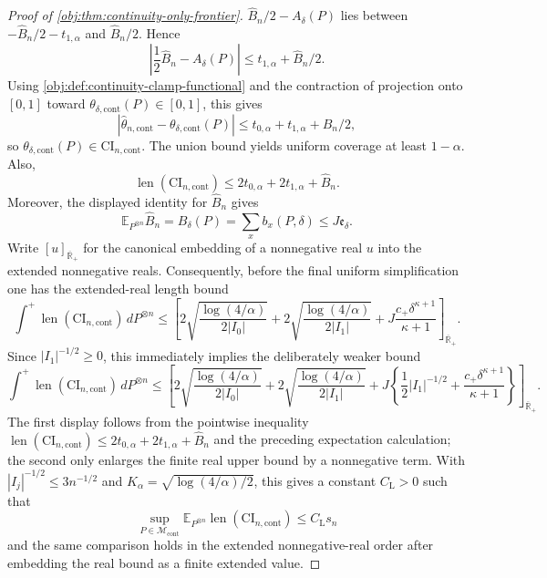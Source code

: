 \begin{proof}[Proof of \cref{obj:thm:continuity-only-frontier}]
\(\widehat B_n/2-A_\delta(P)\) lies between
\(-\widehat B_n/2-t_{1,\alpha}\) and \(\widehat B_n/2\).  Hence
\[
\left|\frac12\widehat B_n-A_\delta(P)\right|
\leq t_{1,\alpha}+\widehat B_n/2.
\]
Using \cref{obj:def:continuity-clamp-functional} and the contraction of projection onto \([0,1]\)
toward \(\theta_{\delta,\mathrm{cont}}(P)\in[0,1]\), this gives
\[
\left|\widehat\theta_{n,\mathrm{cont}}-\theta_{\delta,\mathrm{cont}}(P)\right|
\leq t_{0,\alpha}+t_{1,\alpha}+\widehat B_n/2,
\]
so \(\theta_{\delta,\mathrm{cont}}(P)\in\mathrm{CI}_{n,\mathrm{cont}}\).  The union bound yields uniform coverage at least \(1-\alpha\).  Also,
\[
\operatorname{len}(\mathrm{CI}_{n,\mathrm{cont}})
\leq
2t_{0,\alpha}+2t_{1,\alpha}+\widehat B_n .
\]
Moreover, the displayed identity for \(\widehat B_n\) gives
\[
\mathbb E_{P^{\otimes n}}\widehat B_n
=B_\delta(P)
=\sum_x b_x(P,\delta)
\leq J\mathfrak e_\delta .
\]
Write \([u]_{\overline{\mathbb R}_+}\) for the canonical embedding of a nonnegative real \(u\) into the extended nonnegative reals.  Consequently, before the final uniform simplification one has the extended-real length bound
\[
\int^{+}\operatorname{len}(\mathrm{CI}_{n,\mathrm{cont}})\,dP^{\otimes n}
\leq
\left[
2\sqrt{\frac{\log(4/\alpha)}{2|I_0|}}
+2\sqrt{\frac{\log(4/\alpha)}{2|I_1|}}
+J\frac{c_+\delta^{\kappa+1}}{\kappa+1}
\right]_{\overline{\mathbb R}_+}.
\]
Since \(|I_1|^{-1/2}\geq0\), this immediately implies the deliberately weaker bound
\[
\int^{+}\operatorname{len}(\mathrm{CI}_{n,\mathrm{cont}})\,dP^{\otimes n}
\leq
\left[
2\sqrt{\frac{\log(4/\alpha)}{2|I_0|}}
+2\sqrt{\frac{\log(4/\alpha)}{2|I_1|}}
+J\left\{\frac12|I_1|^{-1/2}
+\frac{c_+\delta^{\kappa+1}}{\kappa+1}\right\}
\right]_{\overline{\mathbb R}_+}.
\]
The first display follows from the pointwise inequality
\(\operatorname{len}(\mathrm{CI}_{n,\mathrm{cont}})\leq2t_{0,\alpha}+2t_{1,\alpha}+\widehat B_n\) and the preceding expectation calculation; the second only enlarges the finite real upper bound by a nonnegative term.  With \(|I_j|^{-1/2}\leq3n^{-1/2}\) and
\(K_\alpha=\sqrt{\log(4/\alpha)/2}\), this gives a constant \(C_{\mathrm L}>0\) such that
\[
\sup_{P\in\mathcal M_{\mathrm{cont}}}
\mathbb E_{P^{\otimes n}}\operatorname{len}(\mathrm{CI}_{n,\mathrm{cont}})
\leq C_{\mathrm L}s_n
\]
and the same comparison holds in the extended nonnegative-real order after embedding the real bound as a finite extended value.


\end{proof}
